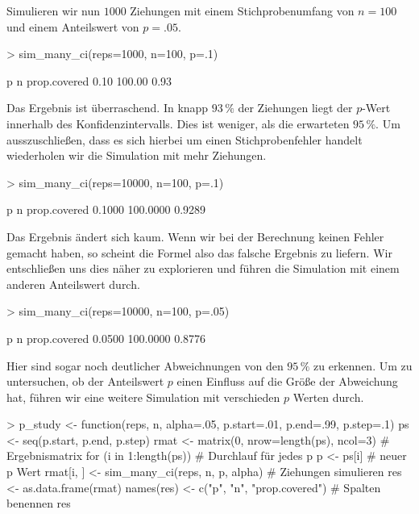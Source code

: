 Simulieren wir nun $1000$ Ziehungen mit einem Stichprobenumfang von $n=100$ und einem Anteilswert von $p=.05$.
 
\begin{Schunk}
\begin{Sinput}
> sim_many_ci(reps=1000, n=100, p=.1)  
\end{Sinput}
\begin{Soutput}
           p            n prop.covered 
        0.10       100.00         0.93 
\end{Soutput}
\end{Schunk}

Das Ergebnis ist überraschend. In knapp $93\,\%$ der Ziehungen liegt der $p$-Wert  innerhalb des Konfidenzintervalls. Dies ist weniger, als die erwarteten $95\,\%$. Um ausszuschließen, dass es sich hierbei um einen Stichprobenfehler handelt wiederholen wir die Simulation mit mehr Ziehungen.

\begin{Schunk}
\begin{Sinput}
> sim_many_ci(reps=10000, n=100, p=.1)  
\end{Sinput}
\begin{Soutput}
           p            n prop.covered 
      0.1000     100.0000       0.9289 
\end{Soutput}
\end{Schunk}

Das Ergebnis ändert sich kaum. Wenn wir bei der Berechnung keinen Fehler gemacht haben, so scheint die Formel also das falsche Ergebnis zu liefern. Wir entschließen uns dies näher zu explorieren und führen die Simulation mit einem anderen Anteilswert durch.

\begin{Schunk}
\begin{Sinput}
> sim_many_ci(reps=10000, n=100, p=.05)  
\end{Sinput}
\begin{Soutput}
           p            n prop.covered 
      0.0500     100.0000       0.8776 
\end{Soutput}
\end{Schunk}

Hier sind sogar noch deutlicher Abweichnungen von den $95\,\%$ zu erkennen. Um zu untersuchen, ob der Anteilswert $p$ einen Einfluss auf die Größe der Abweichung hat, führen wir eine weitere Simulation mit verschieden $p$ Werten durch.

\begin{Schunk}
\begin{Sinput}
> p_study <- function(reps, n, alpha=.05,
                     p.start=.01, p.end=.99, p.step=.1){  
   ps <- seq(p.start, p.end, p.step)                   
   rmat <- matrix(0, nrow=length(ps), ncol=3)    # Ergebnismatrix
   for (i in 1:length(ps)){                      # Durchlauf für jedes p
     p <- ps[i]                                  # neuer p Wert
     rmat[i, ] <- sim_many_ci(reps, n, p, alpha) # Ziehungen simulieren 
   } 
   res <- as.data.frame(rmat)                   
   names(res) <- c("p", "n", "prop.covered")     # Spalten benennen 
   res
 } 
\end{Sinput}
\end{Schunk}

